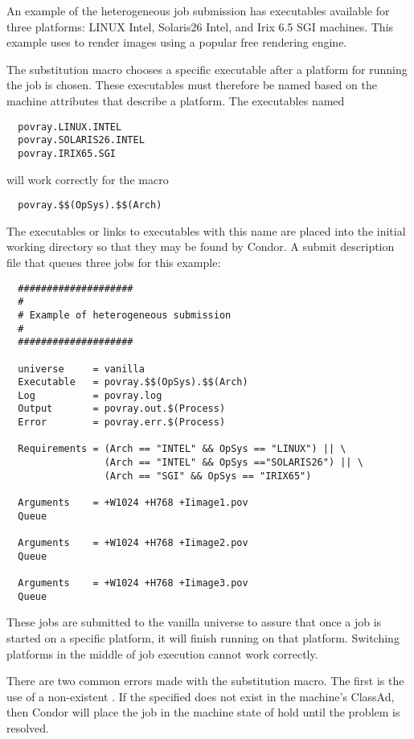 An example of the heterogeneous job submission
has executables available for three platforms:
LINUX Intel, Solaris26 Intel, and Irix 6.5 SGI machines.
This example uses 
to render images using a popular free rendering engine.

The substitution macro chooses a specific executable after
a platform for running the job is chosen.
These executables must therefore be named based on the
machine attributes that describe a platform.
The executables named \begin{verbatim}
  povray.LINUX.INTEL
  povray.SOLARIS26.INTEL
  povray.IRIX65.SGI
\end{verbatim}
will work correctly for the macro
\begin{verbatim}
  povray.$$(OpSys).$$(Arch)
\end{verbatim}

The executables or links to executables with this name
are placed into the initial working directory so that they may be
found by Condor. 
A submit description file that queues three jobs for this example:

\begin{verbatim}
  ####################
  #
  # Example of heterogeneous submission
  #
  ####################

  universe     = vanilla
  Executable   = povray.$$(OpSys).$$(Arch)
  Log          = povray.log
  Output       = povray.out.$(Process)
  Error        = povray.err.$(Process)

  Requirements = (Arch == "INTEL" && OpSys == "LINUX") || \
                 (Arch == "INTEL" && OpSys =="SOLARIS26") || \
                 (Arch == "SGI" && OpSys == "IRIX65")

  Arguments    = +W1024 +H768 +Iimage1.pov
  Queue 

  Arguments    = +W1024 +H768 +Iimage2.pov
  Queue 

  Arguments    = +W1024 +H768 +Iimage3.pov
  Queue 
\end{verbatim}

These jobs are submitted to the vanilla universe
to assure that once a job is started on a specific platform,
it will finish running on that platform.
Switching platforms in the middle of job execution cannot
work correctly.

There are two common errors made with the substitution macro.
The first is the use of a non-existent .
If the specified \AdAttr{MachineAdAttribute} does not
exist in the machine's ClassAd, then Condor will place
the job in the machine state of hold until the problem is resolved.

